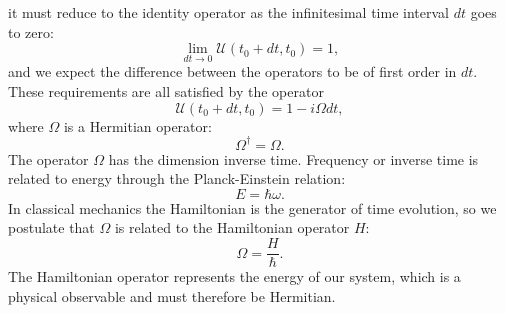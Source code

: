 it must reduce to the identity operator as the infinitesimal
time interval $dt$ goes to zero:
\begin{equation}
 \lim_{dt \rightarrow 0} \mathcal{U}(t_0 + dt, t_0) = 1,
\end{equation}
and we expect the difference between the operators
to be of first order in $dt$.
\newline
These requirements are all satisfied by the operator
\begin{equation}
 \mathcal{U}(t_0 + dt, t_0) = 1 - i\Omega dt ,
\end{equation}
where $\Omega$ is a Hermitian operator:
\begin{equation}
 \Omega^{\dagger} = \Omega .
\end{equation}
The operator $\Omega$ has the dimension inverse time.
Frequency or inverse time is related to energy
through the Planck-Einstein relation:
\begin{equation}
 E = \hbar \omega .
\end{equation}
In classical mechanics the Hamiltonian is the generator of time evolution,
so we postulate that $\Omega$ is related to the Hamiltonian operator
$H$:
\begin{equation}
 \Omega = \frac{H}{\hbar} .
\end{equation}
The Hamiltonian operator represents the energy of our system,
which is a physical observable and must therefore be Hermitian.

